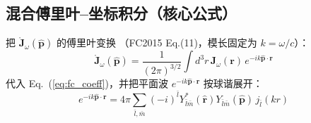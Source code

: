 \subsection{混合傅里叶--坐标积分（核心公式）}

把 $\mathring{\mathbf{J}}_\omega(\hat{\mathbf{p}})$ 的傅里叶变换
（FC2015 Eq.(11)，模长固定为 $k=\omega/c$）：
\begin{equation}
  \mathring{\mathbf{J}}_\omega(\hat{\mathbf{p}})
  = \frac{1}{(2\pi)^{3/2}}\int d^3r\,\mathbf{J}_\omega(\mathbf{r})\,
    e^{-ik\hat{\mathbf{p}}\cdot\mathbf{r}}
  \label{eq:fc_fourier}
\end{equation}
代入 Eq.~(\ref{eq:fc_coeff})，并把平面波 $e^{-ik\hat{\mathbf{p}}\cdot\mathbf{r}}$ 按球谐展开：
\begin{equation}
  e^{-ik\hat{\mathbf{p}}\cdot\mathbf{r}} = 4\pi\sum_{\bar{l},\bar{m}}(-i)^{\bar{l}}
    Y^*_{\bar{l}\bar{m}}(\hat{\mathbf{r}})Y_{\bar{l}\bar{m}}(\hat{\mathbf{p}})\,j_{\bar{l}}(kr)
  \label{eq:plane_expand}
\end{equation}

